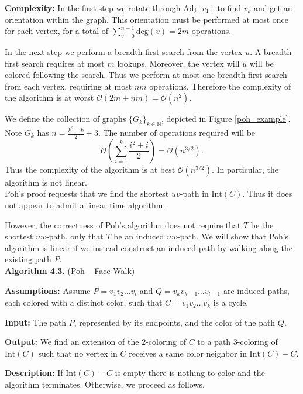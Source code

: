 \documentclass[letterpaper, 12pt]{article}
\theoremstyle{definition}
\theoremstyle{definition}
\theoremstyle{thm}
\theoremstyle{definition}
\begin{document}
\noindent\textbf{Complexity:} In the first step we rotate through
$\text{Adj}[v_1]$ to find $v_k$ and get an orientation within the graph. This
orientation must be performed at most once for each vertex, for a total of
$\sum_{v=0}^{n-1}\text{deg}(v)=2m$ operations.

In the next step we perform a breadth first search from the vertex $u$.
A breadth first search requires at most $m$ lookups. Moreover, the vertex will
$u$ will be colored following the search. Thus we perform at most one breadth
first search from each vertex, requiring at most $nm$ operations.
Therefore the complexity of the algorithm is at worst
$\mathcal{O}(2m + nm)=\mathcal{O}(n^2)$.

We define the collection of graphs $\{G_k\}_{k\in\mathbb{N}}$, depicted in
Figure \ref{poh_example}.
Note $G_k$ has $n=\frac{k^2+k}{2}+3$. The number of operations required will be
\[
    \mathcal{O}\left(\sum_{i=1}^k \frac{i^2+i}{2}\right)=\mathcal{O}(n^{3/2}).
\]
Thus the complexity of the algorithm is at best $\mathcal{O}(n^{3/2})$. In
particular, the algorithm is not linear.\\

Poh's proof requests that we find the shortest $uv$-path in $\text{Int}(C)$.
Thus it does not appear to admit a linear time algorithm.

However, the correctness of Poh's algorithm does not require that $T$
be the shortest $uw$-path, only that $T$ be an induced $uw$-path. We will show
that Poh's algorithm is linear if we instead construct an induced path by
walking along the existing path $P$.\\

\noindent\textbf{Algorithm 4.3.} (Poh -- Face Walk)

\noindent\textbf{Assumptions:} Assume $P=v_1v_2\ldots v_l$ and
$Q=v_kv_{k-1}\ldots v_{l+1}$ are induced paths, each colored with a distinct
color, such that $C=v_1v_2\ldots v_k$ is a cycle.

\noindent\textbf{Input:} The path $P$, represented by its endpoints, and the
color of the path $Q$.

\noindent\textbf{Output:} We find an extension of the $2$-coloring of $C$ to
a path $3$-coloring of $\text{Int}(C)$ such that
no vertex in $C$ receives a same color neighbor in $\text{Int}(C)-C$.

\noindent\textbf{Description:} If $\text{Int}(C)-C$ is empty there is nothing to
color and the algorithm terminates. Otherwise, we proceed as follows.
\end{document}
